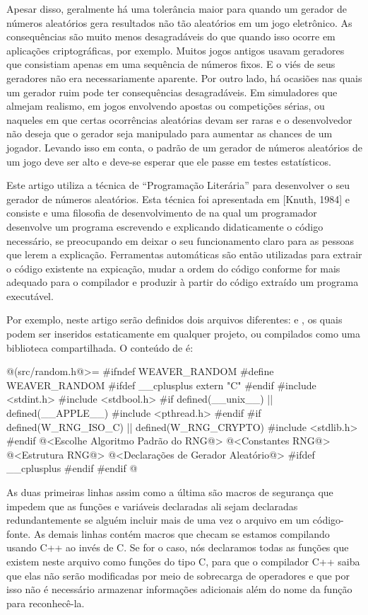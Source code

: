 Apesar disso, geralmente há uma tolerância maior para quando um
gerador de números aleatórios gera resultados não tão aleatórios em um
jogo eletrônico. As consequências são muito menos desagradáveis do que
quando isso ocorre em aplicações criptográficas, por exemplo. Muitos
jogos antigos usavam geradores que consistiam apenas em uma sequência
de números fixos. E o viés de seus geradores não era necessariamente
aparente. Por outro lado, há ocasiões nas quais um gerador ruim pode
ter consequências desagradáveis. Em simuladores que almejam realismo,
em jogos envolvendo apostas ou competições sérias, ou naqueles em que
certas ocorrências aleatórias devam ser raras e o desenvolvedor não
deseja que o gerador seja manipulado para aumentar as chances de um
jogador. Levando isso em conta, o padrão de um gerador de números
aleatórios de um jogo deve ser alto e deve-se esperar que ele passe em
testes estatísticos.


Este artigo utiliza a técnica de ``Programação Literária'' para
desenvolver o seu gerador de números aleatórios. Esta técnica foi apresentada
em [Knuth, 1984] e consiste e uma filosofia de desenvolvimento de
 na qual um programador desenvolve um programa escrevendo
e explicando didaticamente o código necessário, se preocupando em
deixar o seu funcionamento claro para as pessoas que lerem a
explicação. Ferramentas automáticas são então utilizadas para extrair
o código existente na expicação, mudar a ordem do código conforme for
mais adequado para o compilador e produzir à partir do código extraído
um programa executável.

Por exemplo, neste artigo serão definidos dois arquivos
diferentes:  e , os quais
podem ser inseridos estaticamente em qualquer projeto, ou compilados
como uma biblioteca compartilhada. O conteúdo de 
é:

\iniciocodigo
@(src/random.h@>=
#ifndef WEAVER_RANDOM
#define WEAVER_RANDOM
#ifdef __cplusplus
extern "C" {
#endif
#include <stdint.h>
#include <stdbool.h>
#if defined(__unix__) || defined(__APPLE__)
#include <pthread.h>
#endif
#if defined(W_RNG_ISO_C) || defined(W_RNG_CRYPTO)
#include <stdlib.h>
#endif
@<Escolhe Algoritmo Padrão do RNG@>
@<Constantes RNG@>
@<Estrutura RNG@>
@<Declarações de Gerador Aleatório@>
#ifdef __cplusplus
}
#endif
#endif
@
\fimcodigo

As duas primeiras linhas assim como a última são macros de segurança
que impedem que as funções e variáveis declaradas ali sejam declaradas
redundantemente se alguém incluir mais de uma vez o arquivo em um
código-fonte. As demais linhas contém macros que checam se estamos
compilando usando C++ ao invés de C. Se for o caso, nós declaramos
todas as funções que existem neste arquivo como funções do tipo C,
para que o compilador C++ saiba que elas não serão modificadas por
meio de sobrecarga de operadores e que por isso não é necessário
armazenar informações adicionais além do nome da função para
reconhecê-la.

